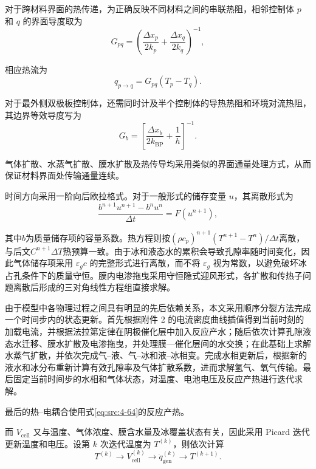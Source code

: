 \documentclass[bwprint]{gmcmthesis}
\numberwithin{equation}{section}
\numberwithin{figure}{section}
\begin{document}
对于跨材料界面的热传递，为正确反映不同材料之间的串联热阻，相邻控制体 \(p\) 和 \(q\) 的界面导度取为
\begin{equation}
G_{pq} = \left( \frac{\Delta x_p}{2k_p} + \frac{\Delta x_q}{2k_q} \right)^{-1}, \label{eq:src:4-82}
\end{equation}

 相应热流为
\begin{equation}
q_{p\to q} = G_{pq}(T_p - T_q). \label{eq:src:4-83}
\end{equation}

 对于最外侧双极板控制体，还需同时计及半个控制体的导热热阻和环境对流热阻，其边界等效导度写为
\begin{equation}
G_b = \left[ \frac{\Delta x_b}{2k_{\text{BP}}} + \frac{1}{h} \right]^{-1}. \label{eq:src:4-84}
\end{equation}

 气体扩散、水蒸气扩散、膜水扩散及热传导均采用类似的界面通量处理方式，从而保证材料界面处传输通量连续。

 时间方向采用一阶向后欧拉格式。对于一般形式的储存变量 \(u\)，其离散形式为
\begin{equation}
\frac{b^{n+1}u^{n+1} - b^n u^n}{\Delta t} = F(u^{n+1}), \label{eq:src:4-85}
\end{equation}

其中$b$为质量储存项的容量系数。热方程则按$(\rho c_p)^{n+1}(T^{n+1}-T^n)/\Delta t$离散，与后文$C^{n+1}\Delta T$热预算一致。由于冰和液态水的累积会导致孔隙率随时间变化，因此气体储存项采用 \(\varepsilon_g c\) 的完整形式进行离散，而不将 \(\varepsilon_g\) 视为常数，以避免破坏冰占孔条件下的质量守恒。膜内电渗拖曳采用守恒隐式迎风形式，各扩散和传热子问题离散后形成的三对角线性方程组直接求解。
 
 由于模型中各物理过程之间具有明显的先后依赖关系，本文采用顺序分裂方法完成一个时间步内的状态更新。首先根据附件 2 的电流密度曲线插值得到当前时刻的加载电流，并根据法拉第定律在阴极催化层中加入反应产水；随后依次计算孔隙液态水迁移、膜水扩散及电渗拖曳，并处理膜—催化层间的水交换；在此基础上求解水蒸气扩散，并依次完成气–液、气–冰和液–冰相变。完成水相更新后，根据新的液水和冰分布重新计算有效孔隙率及气体扩散系数，进而求解氢气、氧气传输。最后固定当前时间步的水相和气体状态，对温度、电池电压及反应产热进行迭代求解。

最后的热--电耦合使用式\eqref{eq:src:4-64}的反应产热。

而 \(V_{\text{cell}}\) 又与温度、气体浓度、膜含水量及冰覆盖状态有关，因此采用 Picard 迭代更新温度和电压。设第 \(k\) 次迭代温度为 \(T^{(k)}\)，则依次计算
\begin{equation}
T^{(k)} \to V_{\text{cell}}^{(k)} \to \dot{q}_{\text{gen}}^{(k)} \to T^{(k+1)}. \label{eq:src:4-87}
\end{equation}
\end{document}

